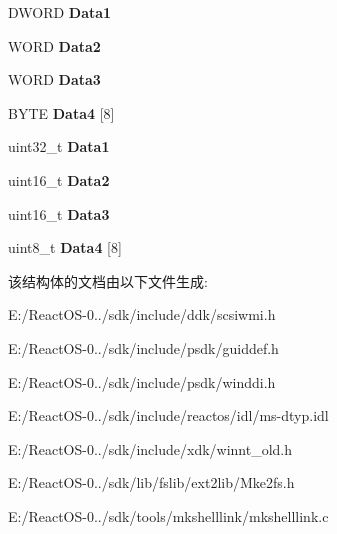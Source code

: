 \begin{DoxyCompactItemize}
D\+W\+O\+RD {\bfseries Data1}
\item 
\mbox{\label{struct___g_u_i_d_a3aa0cfc3e77e93e927c3cb290c39c9b8}} 
W\+O\+RD {\bfseries Data2}
\item 
\mbox{\label{struct___g_u_i_d_a58532a41c6a16e1c40aea7ea1464468c}} 
W\+O\+RD {\bfseries Data3}
\item 
\mbox{\label{struct___g_u_i_d_af22e808ae9a6444d1d1cde352eb7be8d}} 
B\+Y\+TE {\bfseries Data4} \mbox{[}8\mbox{]}
\item 
\mbox{\label{struct___g_u_i_d_a9ec263413dff4d5b7aee2893aae81dec}} 
uint32\+\_\+t {\bfseries Data1}
\item 
\mbox{\label{struct___g_u_i_d_a99ac6b91d04d793d279b139c502acca7}} 
uint16\+\_\+t {\bfseries Data2}
\item 
\mbox{\label{struct___g_u_i_d_ace38498cdf650038cd46ac5a7ed30f0b}} 
uint16\+\_\+t {\bfseries Data3}
\item 
\mbox{\label{struct___g_u_i_d_aee8bf961736c923df571e616333dfbd8}} 
uint8\+\_\+t {\bfseries Data4} \mbox{[}8\mbox{]}
\end{DoxyCompactItemize}


该结构体的文档由以下文件生成\+:\begin{DoxyCompactItemize}
\item 
E\+:/\+React\+O\+S-\/0../sdk/include/ddk/scsiwmi.\+h\item 
E\+:/\+React\+O\+S-\/0../sdk/include/psdk/guiddef.\+h\item 
E\+:/\+React\+O\+S-\/0../sdk/include/psdk/winddi.\+h\item 
E\+:/\+React\+O\+S-\/0../sdk/include/reactos/idl/ms-\/dtyp.\+idl\item 
E\+:/\+React\+O\+S-\/0../sdk/include/xdk/winnt\+\_\+old.\+h\item 
E\+:/\+React\+O\+S-\/0../sdk/lib/fslib/ext2lib/Mke2fs.\+h\item 
E\+:/\+React\+O\+S-\/0../sdk/tools/mkshelllink/mkshelllink.\+c\end{DoxyCompactItemize}
